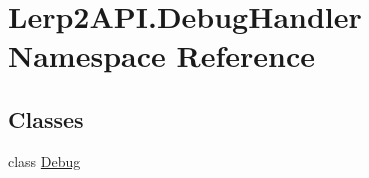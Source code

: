 \hypertarget{namespace_lerp2_a_p_i_1_1_debug_handler}{}\section{Lerp2\+A\+P\+I.\+Debug\+Handler Namespace Reference}
\label{namespace_lerp2_a_p_i_1_1_debug_handler}
\subsection*{Classes}
\begin{DoxyCompactItemize}
\item 
class \hyperlink{class_lerp2_a_p_i_1_1_debug_handler_1_1_debug}{Debug}
\end{DoxyCompactItemize}
